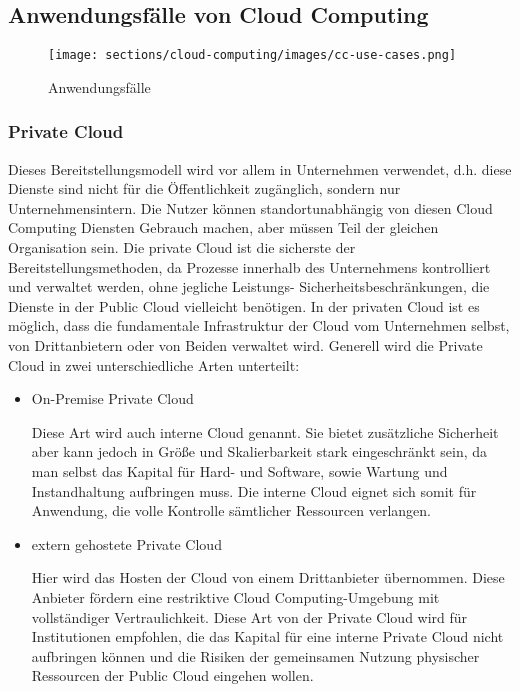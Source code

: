 \subsection{Anwendungsfälle von Cloud Computing}

\begin{figure}[h]
    \centering
    \texttt{[image: sections/cloud-computing/images/cc-use-cases.png]}
    \caption{Anwendungsfälle}
\end{figure}

\subsubsection{Private Cloud}

Dieses Bereitstellungsmodell wird vor allem in Unternehmen verwendet, d.h. diese Dienste sind nicht für die Öffentlichkeit zugänglich, sondern nur Unternehmensintern. Die Nutzer können standortunabhängig von diesen Cloud Computing Diensten Gebrauch machen, aber müssen Teil der gleichen Organisation sein. Die private Cloud ist die sicherste der Bereitstellungsmethoden, da Prozesse innerhalb des Unternehmens kontrolliert und verwaltet werden, ohne jegliche Leistungs- Sicherheitsbeschränkungen, die Dienste in der Public Cloud vielleicht benötigen. In der privaten Cloud ist es möglich, dass die fundamentale Infrastruktur der Cloud vom Unternehmen selbst, von Drittanbietern oder von Beiden verwaltet wird. Generell wird die Private Cloud in zwei unterschiedliche Arten unterteilt:

\begin{itemize}
    \item On-Premise Private Cloud
    \begin{sloppypar}
        Diese Art wird auch interne Cloud genannt. Sie bietet zusätzliche Sicherheit aber kann jedoch in Größe und Skalierbarkeit stark eingeschränkt sein, da man selbst das Kapital für Hard- und Software, sowie Wartung und Instandhaltung aufbringen muss. Die interne Cloud eignet sich somit für Anwendung, die volle Kontrolle sämtlicher Ressourcen verlangen.
    \end{sloppypar}
    \item extern gehostete Private Cloud
    \begin{sloppypar} 
        Hier wird das Hosten der Cloud von einem Drittanbieter übernommen. Diese Anbieter fördern eine restriktive Cloud Computing-Umgebung mit vollständiger Vertraulichkeit. Diese Art von der Private Cloud wird für Institutionen empfohlen, die das Kapital für eine interne Private Cloud nicht aufbringen können und die Risiken der gemeinsamen Nutzung physischer Ressourcen der Public Cloud eingehen wollen.   
    \end{sloppypar} 
\end{itemize}

